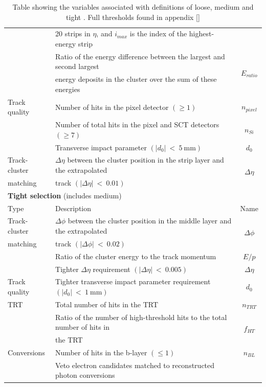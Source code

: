 \begin {table}[h!]
\begin{center}
\begin{tabular}{llc}
							& 20 strips in $\eta$, and $i_{max}$ is the index of the highest-energy strip 	& 						\\
							\rule{0pt}{3ex}
							& Ratio of the energy difference between the largest and second largest  		& \multirow{2}{*}{$E_{ratio}$}			\\
							& energy deposits in the cluster over the sum of these energies					&						\\
\rule{0pt}{4ex}Track quality	& Number of hits in the pixel detector $(\geq1)$							& $n_{pixel}$			\\
							& Number of total hits in the pixel and SCT detectors $(\geq7)$					& $n_{Si}$				\\
							& Transverse impact parameter $(|d_{0}|~<~5~\text{mm})$							& $d_{0}$				\\
\rule{0pt}{4ex}Track-cluster		& $\Delta\eta$ between the cluster position in the strip layer and the extrapolated 	& \multirow{2}{*}{$\Delta\eta$} 	\\
		matching			& track $(|\Delta\eta|~<~0.01)$													& 						\\
		\hline				
		\hline
		\multicolumn{3}{l}{{\bf Tight selection} (includes medium)}																	\\
		Type 				& Description 																	& Name 					\\
		\hline
\rule{0pt}{3ex}Track-cluster		& $\Delta\phi$ between the cluster position in the middle layer and the extrapolated 	& \multirow{2}{*}{$\Delta\phi$}	\\
		matching			& track $(|\Delta\phi|~<~0.02)$													& 						\\
							& Ratio of the cluster energy to the track momentum								& $E/p$					\\
							& Tighter $\Delta\eta$ requirement $(|\Delta\eta|~<~0.005)$						& $\Delta\eta$ 			\\
\rule{0pt}{4ex}Track quality		& Tighter transverse impact parameter requirement $(|d_{0}|~<~1~\text{mm})$		& $d_{0}$				\\
		TRT 				& Total number of hits in the TRT 												& $n_{TRT}$				\\
							& Ratio of the number of high-threshold hits to the total number of hits in 	& \multirow{2}{*}{$f_{HT}$}				\\
							& the TRT 																		& 						\\
\rule{0pt}{4ex}Conversions 	& Number of hits in the b-layer $(\leq1)$ 										& $n_{BL}$				\\
							& Veto electron candidates matched to reconstructed photon conversions 		 	& 						\\
		\hline
  		\end{tabular}
  	\caption{Table showing the variables associated with definitions of loose, medium and tight \cite{Aad:2011mk}. Full thresholds found in appendix \ref{}}
  	\label{tab:Rec_lmt}
  	\end{center}
	\end {table}













